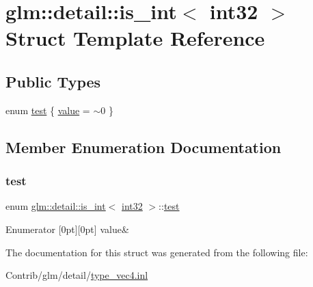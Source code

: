 \hypertarget{structglm_1_1detail_1_1is__int_3_01int32_01_4}{}\section{glm\+:\+:detail\+:\+:is\+\_\+int$<$ int32 $>$ Struct Template Reference}
\label{structglm_1_1detail_1_1is__int_3_01int32_01_4}
\subsection*{Public Types}
\begin{DoxyCompactItemize}
\item 
enum \mbox{\hyperlink{structglm_1_1detail_1_1is__int_3_01int32_01_4_ad400146c56b42f07c8c14c71c5f7322f}{test}} \{ \mbox{\hyperlink{structglm_1_1detail_1_1is__int_3_01int32_01_4_ad400146c56b42f07c8c14c71c5f7322fa24dfcabf3ede34dbfc990ec0c0ed4264}{value}} = $\sim$0
 \}
\end{DoxyCompactItemize}


\subsection{Member Enumeration Documentation}
\mbox{\label{structglm_1_1detail_1_1is__int_3_01int32_01_4_ad400146c56b42f07c8c14c71c5f7322f}} 
\subsubsection{\texorpdfstring{test}{test}}
{\footnotesize\ttfamily enum \mbox{\hyperlink{structglm_1_1detail_1_1is__int}{glm\+::detail\+::is\+\_\+int}}$<$ \mbox{\hyperlink{namespaceglm_1_1detail_a9f85b4efeca416cdcec2fd08939a2e17}{int32}} $>$\+::\mbox{\hyperlink{structglm_1_1detail_1_1is__int_3_01int32_01_4_ad400146c56b42f07c8c14c71c5f7322f}{test}}}

\begin{DoxyEnumFields}{Enumerator}
[0pt][0pt]{}\mbox{\label{structglm_1_1detail_1_1is__int_3_01int32_01_4_ad400146c56b42f07c8c14c71c5f7322fa24dfcabf3ede34dbfc990ec0c0ed4264}} 
value&\\
\hline

\end{DoxyEnumFields}


The documentation for this struct was generated from the following file\+:\begin{DoxyCompactItemize}
\item 
Contrib/glm/detail/\mbox{\hyperlink{type__vec4_8inl}{type\+\_\+vec4.\+inl}}\end{DoxyCompactItemize}
